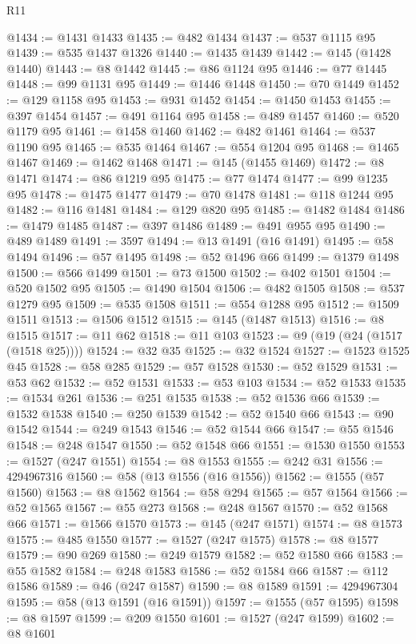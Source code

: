 \begin{lexlean}{R11}
\begin{coremodule}
@1434 := @1431 @1433
@1435 := @482 @1434
@1437 := @537 @1115 @95
@1439 := @535 @1437 @1326
@1440 := @1435 @1439
@1442 := @145 (@1428 @1440)
@1443 := @8 @1442
@1445 := @86 @1124 @95
@1446 := @77 @1445
@1448 := @99 @1131 @95
@1449 := @1446 @1448
@1450 := @70 @1449
@1452 := @129 @1158 @95
@1453 := @931 @1452
@1454 := @1450 @1453
@1455 := @397 @1454
@1457 := @491 @1164 @95
@1458 := @489 @1457
@1460 := @520 @1179 @95
@1461 := @1458 @1460
@1462 := @482 @1461
@1464 := @537 @1190 @95
@1465 := @535 @1464
@1467 := @554 @1204 @95
@1468 := @1465 @1467
@1469 := @1462 @1468
@1471 := @145 (@1455 @1469)
@1472 := @8 @1471
@1474 := @86 @1219 @95
@1475 := @77 @1474
@1477 := @99 @1235 @95
@1478 := @1475 @1477
@1479 := @70 @1478
@1481 := @118 @1244 @95
@1482 := @116 @1481
@1484 := @129 @820 @95
@1485 := @1482 @1484
@1486 := @1479 @1485
@1487 := @397 @1486
@1489 := @491 @955 @95
@1490 := @489 @1489
@1491 := 3597
@1494 := @13 @1491 (@16 @1491)
@1495 := @58 @1494
@1496 := @57 @1495
@1498 := @52 @1496 @66
@1499 := @1379 @1498
@1500 := @566 @1499
@1501 := @73 @1500
@1502 := @402 @1501
@1504 := @520 @1502 @95
@1505 := @1490 @1504
@1506 := @482 @1505
@1508 := @537 @1279 @95
@1509 := @535 @1508
@1511 := @554 @1288 @95
@1512 := @1509 @1511
@1513 := @1506 @1512
@1515 := @145 (@1487 @1513)
@1516 := @8 @1515
@1517 := @11 @62
@1518 := @11 @103
@1523 := @9 (@19 (@24 (@1517 (@1518 @25))))
@1524 := @32 @35
@1525 := @32 @1524
@1527 := @1523 @1525 @45
@1528 := @58 @285
@1529 := @57 @1528
@1530 := @52 @1529
@1531 := @53 @62
@1532 := @52 @1531
@1533 := @53 @103
@1534 := @52 @1533
@1535 := @1534 @261
@1536 := @251 @1535
@1538 := @52 @1536 @66
@1539 := @1532 @1538
@1540 := @250 @1539
@1542 := @52 @1540 @66
@1543 := @90 @1542
@1544 := @249 @1543
@1546 := @52 @1544 @66
@1547 := @55 @1546
@1548 := @248 @1547
@1550 := @52 @1548 @66
@1551 := @1530 @1550
@1553 := @1527 (@247 @1551)
@1554 := @8 @1553
@1555 := @242 @31
@1556 := 4294967316
@1560 := @58 (@13 @1556 (@16 @1556))
@1562 := @1555 (@57 @1560)
@1563 := @8 @1562
@1564 := @58 @294
@1565 := @57 @1564
@1566 := @52 @1565
@1567 := @55 @273
@1568 := @248 @1567
@1570 := @52 @1568 @66
@1571 := @1566 @1570
@1573 := @145 (@247 @1571)
@1574 := @8 @1573
@1575 := @485 @1550
@1577 := @1527 (@247 @1575)
@1578 := @8 @1577
@1579 := @90 @269
@1580 := @249 @1579
@1582 := @52 @1580 @66
@1583 := @55 @1582
@1584 := @248 @1583
@1586 := @52 @1584 @66
@1587 := @112 @1586
@1589 := @46 (@247 @1587)
@1590 := @8 @1589
@1591 := 4294967304
@1595 := @58 (@13 @1591 (@16 @1591))
@1597 := @1555 (@57 @1595)
@1598 := @8 @1597
@1599 := @209 @1550
@1601 := @1527 (@247 @1599)
@1602 := @8 @1601

\end{coremodule}
\end{lexlean}
